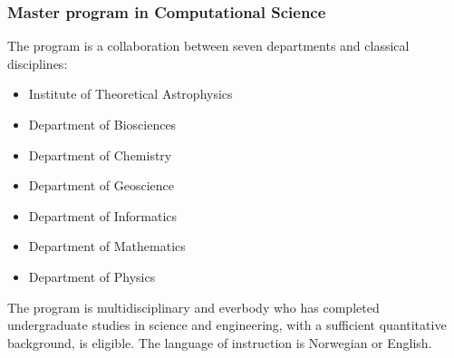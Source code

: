 \documentclass{beamer}
\begin{document}
\begin{frame}
\frametitle{Master program in Computational Science}

\begin{block}{}

The program is a collaboration between seven departments and classical disciplines:

\begin{itemize}
 \item Institute of Theoretical Astrophysics

 \item Department of Biosciences

 \item Department of Chemistry

 \item Department of Geoscience

 \item Department of Informatics

 \item Department of Mathematics

 \item Department of Physics
\end{itemize}

\noindent
The program is multidisciplinary and everbody who  has completed
undergraduate studies in science and engineering, with a sufficient
quantitative background, is eligible.  The language of instruction is
Norwegian or English.



\end{block}
\end{frame}
\end{document}
